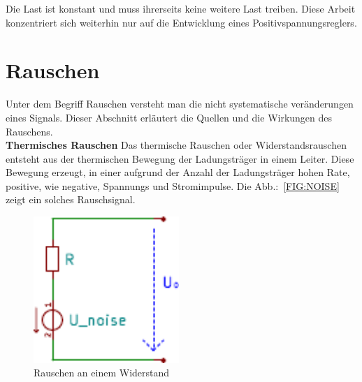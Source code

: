 Die Last ist konstant und muss ihrerseits keine weitere Last treiben.
Diese Arbeit konzentriert sich weiterhin nur auf die Entwicklung eines 
Positivspannungsreglers.

\section{Rauschen}
Unter dem Begriff Rauschen versteht man die nicht systematische veränderungen
eines Signals.
Dieser Abschnitt erläutert die Quellen und die Wirkungen des Rauschens.\\

\textbf{Thermisches Rauschen}
Das thermische Rauschen oder Widerstandsrauschen entsteht aus der thermischen 
Bewegung der Ladungsträger in einem Leiter.
Diese Bewegung erzeugt, in einer aufgrund der Anzahl der Ladungsträger
hohen Rate, positive, wie negative, Spannungs und Stromimpulse. 
Die Abb.:~\ref{FIG:NOISE} zeigt ein solches Rauschsignal.

\begin{figure}
  \centering
  \includegraphics[clip, width=0.49\textwidth]
  {./../common/schaltungen/widerstandsrauschen/widerstandsrauschen.pdf}
  \caption{Rauschen an einem Widerstand}\label{FIG:NOISEESB}
\end{figure}

